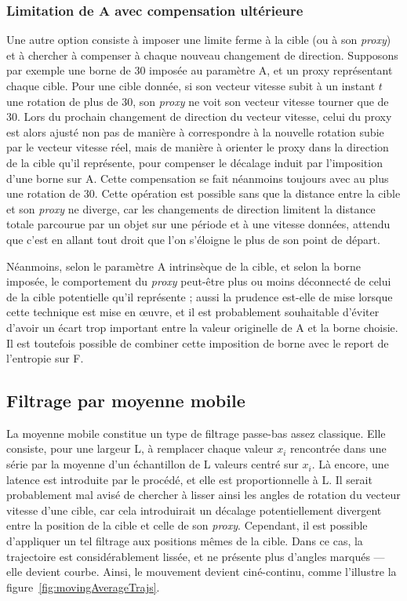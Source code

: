 	\subsubsection{Limitation de A avec compensation ultérieure}
	Une autre option consiste à imposer une limite ferme à la cible (ou à son \emph{proxy}) et à chercher à compenser à chaque nouveau changement de direction. Supposons par exemple une borne de 30\textdegree{} imposée au paramètre A, et un proxy représentant chaque cible. Pour une cible donnée, si son vecteur vitesse subit à un instant $t$ une rotation de plus de 30\textdegree{}, son \emph{proxy} ne voit son vecteur vitesse tourner que de 30\textdegree{}. Lors du prochain changement de direction du vecteur vitesse, celui du proxy est alors ajusté non pas de manière à correspondre à la nouvelle rotation subie par le vecteur vitesse réel, mais de manière à orienter le proxy dans la direction de la cible qu'il représente, pour compenser le décalage induit par l'imposition d'une borne sur A. Cette compensation se fait néanmoins toujours avec au plus une rotation de 30\textdegree{}. Cette opération est possible sans que la distance entre la cible et son \emph{proxy} ne diverge, car les changements de direction limitent la distance totale parcourue par un objet sur une période et à une vitesse données, attendu que c'est en allant tout droit que l'on s'éloigne le plus de son point de départ.
	
	Néanmoins, selon le paramètre A intrinsèque de la cible, et selon la borne imposée, le comportement du \emph{proxy} peut-être plus ou moins déconnecté de celui de la cible potentielle qu'il représente ; aussi la prudence est-elle de mise lorsque cette technique est mise en œuvre, et il est probablement souhaitable d'éviter d'avoir un écart trop important entre la valeur originelle de A et la borne choisie. Il est toutefois possible de combiner cette imposition de borne avec le report de l'entropie sur F.
	
	\subsection{Filtrage par moyenne mobile}
	La moyenne mobile constitue un type de filtrage passe-bas assez classique. Elle consiste, pour une largeur L, à remplacer chaque valeur $x_{i}$ rencontrée dans une série par la moyenne d'un échantillon de L valeurs centré sur $x_{i}$. Là encore, une latence est introduite par le procédé, et elle est proportionnelle à L. Il serait probablement mal avisé de chercher à lisser ainsi les angles de rotation du vecteur vitesse d'une cible, car cela introduirait un décalage potentiellement divergent entre la position de la cible et celle de son \emph{proxy}. Cependant, il est possible d'appliquer un tel filtrage aux positions mêmes de la cible. Dans ce cas, la trajectoire est considérablement lissée, et ne présente plus d'angles marqués --- elle devient courbe. Ainsi, le mouvement devient ciné-continu, comme l'illustre la figure~\ref{fig:movingAverageTrajs}.
	
